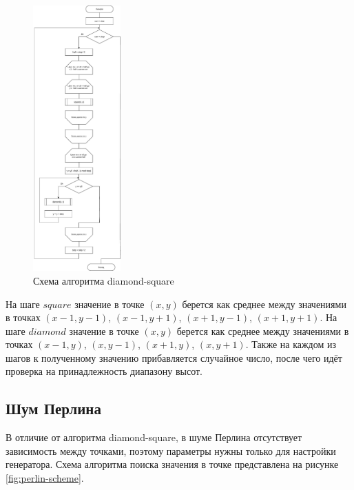 \begin{figure}[h!]
	\centering
	\includegraphics[width=0.3\textwidth]{tex_parts/ds-diagram.pdf}
	\caption{\label{fig:ds-scheme}Схема алгоритма diamond-square}
\end{figure}

На шаге $square$ значение в точке $(x, y)$ берется как среднее между значениями в точках $(x - 1, y - 1)$, $(x - 1, y + 1)$, $(x + 1, y - 1)$, $(x + 1, y + 1)$. На шаге $diamond$ значение в точке $(x, y)$ берется как среднее между значениями в точках $(x - 1, y)$, $(x, y - 1)$, $(x + 1, y)$, $(x, y + 1)$.  Также на каждом из шагов к полученному значению прибавляется случайное число, после чего идёт проверка на принадлежность диапазону высот.

\subsection{Шум Перлина}

В отличие от алгоритма diamond-square, в шуме Перлина отсутствует зависимость между точками, поэтому параметры нужны только для настройки генератора. Схема алгоритма поиска значения в точке представлена на рисунке \ref{fig:perlin-scheme}. 

